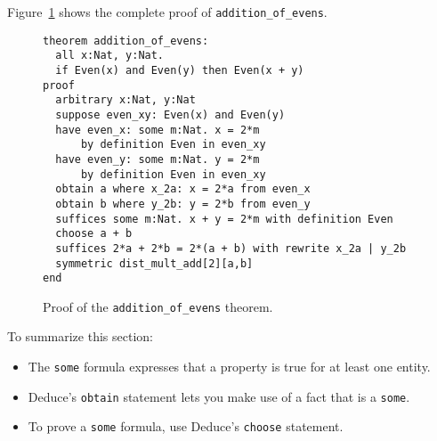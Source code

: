 \documentclass[12pt]{article}
\begin{document}
\noindent Figure~\ref{fig:add-evens} shows the complete proof of
\texttt{addition\_of\_evens}.

\begin{figure}[tbp]
\begin{verbatim}
theorem addition_of_evens:
  all x:Nat, y:Nat.
  if Even(x) and Even(y) then Even(x + y)
proof
  arbitrary x:Nat, y:Nat
  suppose even_xy: Even(x) and Even(y)
  have even_x: some m:Nat. x = 2*m
      by definition Even in even_xy
  have even_y: some m:Nat. y = 2*m
      by definition Even in even_xy
  obtain a where x_2a: x = 2*a from even_x
  obtain b where y_2b: y = 2*b from even_y
  suffices some m:Nat. x + y = 2*m with definition Even
  choose a + b
  suffices 2*a + 2*b = 2*(a + b) with rewrite x_2a | y_2b
  symmetric dist_mult_add[2][a,b]
end
\end{verbatim}
\caption{Proof of the \texttt{addition\_of\_evens} theorem.}
\label{fig:add-evens}
\end{figure}

To summarize this section:
\begin{itemize}
\item The \texttt{some} formula expresses that a property is true for
  at least one entity.
\item Deduce's \texttt{obtain} statement lets you make
  use of a fact that is a \texttt{some}.
\item To prove a \texttt{some} formula, use Deduce's \texttt{choose}
  statement.
\end{itemize}
\end{document}
